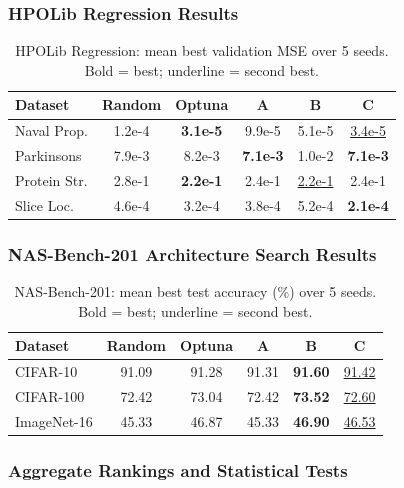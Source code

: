 \subsubsection{HPOLib Regression Results}

\begin{table}[H]
\centering
\caption{HPOLib Regression: mean best validation MSE over 5 seeds. Bold = best; underline = second best.}
\label{tab:hpolib_reg}
\renewcommand{\arraystretch}{1.15}
\begin{tabular}{lccccc}
\toprule
\textbf{Dataset} & \textbf{Random} & \textbf{Optuna} & \textbf{A} & \textbf{B} & \textbf{C} \\
\midrule
Naval Prop.     & 1.2e-4 & \textbf{3.1e-5} & 9.9e-5 & 5.1e-5 & \underline{3.4e-5} \\
Parkinsons      & 7.9e-3 & 8.2e-3 & \textbf{7.1e-3} & 1.0e-2 & \textbf{7.1e-3} \\
Protein Str.    & 2.8e-1 & \textbf{2.2e-1} & 2.4e-1 & \underline{2.2e-1} & 2.4e-1 \\
Slice Loc.      & 4.6e-4 & 3.2e-4 & 3.8e-4 & 5.2e-4 & \textbf{2.1e-4} \\
\bottomrule
\end{tabular}
\end{table}

\subsubsection{NAS-Bench-201 Architecture Search Results}

\begin{table}[H]
\centering
\caption{NAS-Bench-201: mean best test accuracy (\%) over 5 seeds. Bold = best; underline = second best.}
\label{tab:nasbench_results}
\renewcommand{\arraystretch}{1.15}
\begin{tabular}{lccccc}
\toprule
\textbf{Dataset} & \textbf{Random} & \textbf{Optuna} & \textbf{A} & \textbf{B} & \textbf{C} \\
\midrule
CIFAR-10       & 91.09 & 91.28 & 91.31 & \textbf{91.60} & \underline{91.42} \\
CIFAR-100      & 72.42 & 73.04 & 72.42 & \textbf{73.52} & \underline{72.60} \\
ImageNet-16    & 45.33 & 46.87 & 45.33 & \textbf{46.90} & \underline{46.53} \\
\bottomrule
\end{tabular}
\end{table}

\subsubsection{Aggregate Rankings and Statistical Tests}


